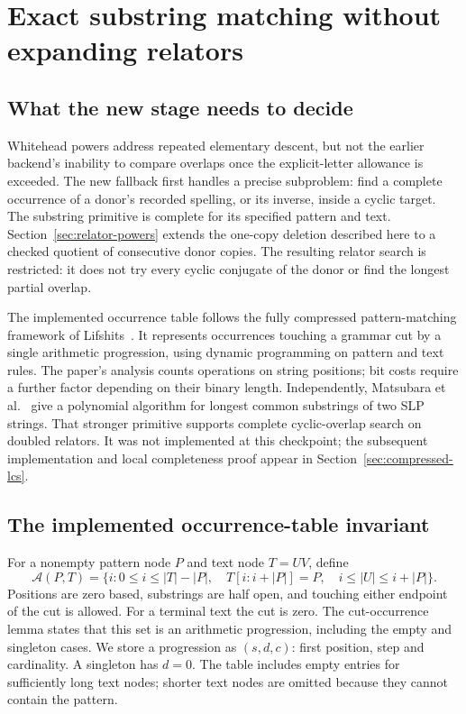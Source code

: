 \section{Exact substring matching without expanding relators}
\label{sec:compressed-matching}

\subsection{What the new stage needs to decide}

Whitehead powers address repeated elementary descent, but not the earlier
backend's inability to compare overlaps once the explicit-letter allowance
is exceeded. The new fallback first handles a precise subproblem: find a
complete occurrence of a donor's recorded spelling, or its inverse, inside
a cyclic target. The substring primitive is complete for its specified
pattern and text. Section~\ref{sec:relator-powers} extends the one-copy
deletion described here to a checked quotient of consecutive donor copies. The resulting relator search is restricted: it does not
try every cyclic conjugate of the donor or find the longest partial overlap.

The implemented occurrence table follows the fully compressed pattern-matching
framework of Lifshits~\cite{lifshits-fcpm}. It represents occurrences touching
a grammar cut by a single arithmetic progression, using dynamic programming
on pattern and text rules. The paper's analysis counts operations on string
positions; bit costs require a further factor depending on their binary
length. Independently, Matsubara et al.~\cite{matsubara-compressed-lcs} give a
polynomial algorithm for longest common substrings of two SLP strings.
That stronger primitive supports complete cyclic-overlap search on doubled
relators. It was not implemented at this checkpoint; the subsequent
implementation and local completeness proof appear in
Section~\ref{sec:compressed-lcs}.

\subsection{The implemented occurrence-table invariant}

For a nonempty pattern node $P$ and text node $T=UV$, define
\[
 \mathcal A(P,T)=\{i:0\le i\le |T|-|P|,\quad
                  T[i:i+|P|]=P,\quad i\le |U|\le i+|P|\}.
\]
Positions are zero based, substrings are half open, and touching either
endpoint of the cut is allowed. For a terminal text the cut is zero.
The cut-occurrence lemma states that this set is an arithmetic progression,
including the empty and singleton cases. We store a progression as
$(s,d,c)$: first position, step and cardinality. A singleton has $d=0$.
The table includes empty entries for sufficiently long text nodes; shorter
text nodes are omitted because they cannot contain the pattern.

